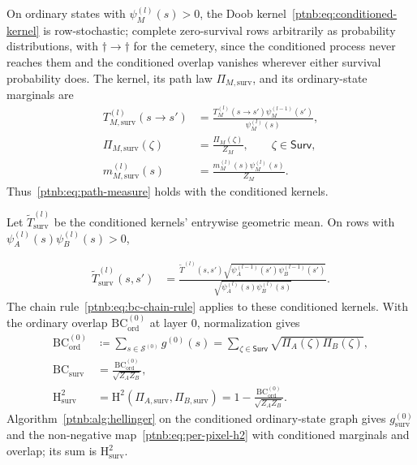\begin{theoremenv}
On ordinary states with $\psi_M^{(l)}(s)>0$, the Doob kernel~\eqref{ptnb:eq:conditioned-kernel} is row-stochastic; complete zero-survival rows arbitrarily as probability distributions, with $\dagger\to\dagger$ for the cemetery, since the conditioned process never reaches them and the conditioned overlap vanishes wherever either survival probability does. The kernel, its path law $\Pi_{M,\mathrm{surv}}$, and its ordinary-state marginals are
\begin{align}
 T_{M,\mathrm{surv}}^{(l)}(s\to s')
 &=\frac{T_M^{(l)}(s\to s')\psi_M^{(l-1)}(s')}{\psi_M^{(l)}(s)},
 \label{ptnb:eq:conditioned-kernel}\\
 \Pi_{M,\mathrm{surv}}(\zeta)
 &=\frac{\Pi_M(\zeta)}{Z_M},\qquad \zeta\in\mathsf{Surv},
 \label{ptnb:eq:conditioned-path-measure}\\
 m_{M,\mathrm{surv}}^{(l)}(s)
 &=\frac{m_M^{(l)}(s)\psi_M^{(l)}(s)}{Z_M}.
 \label{ptnb:eq:conditioned-alpha}
\end{align}
Thus~\eqref{ptnb:eq:path-measure} holds with the conditioned kernels.
{\setlength{\emergencystretch}{4em}%
Let $\widetilde T_{\mathrm{surv}}^{(l)}$ be the conditioned kernels' entrywise geometric mean. On rows with $\psi_A^{(l)}(s)\psi_B^{(l)}(s)>0$,\par}
\begin{align}
 \widetilde T_{\mathrm{surv}}^{(l)}(s,s')
 &=\frac{\widetilde T^{(l)}(s,s')\sqrt{\psi_A^{(l-1)}(s')\psi_B^{(l-1)}(s')}}
 {\sqrt{\psi_A^{(l)}(s)\psi_B^{(l)}(s)}}.
 \label{ptnb:eq:conditioned-geom-kernel}
\end{align}
The chain rule~\eqref{ptnb:eq:bc-chain-rule} applies to these conditioned kernels. With the ordinary overlap $\mathrm{BC}_{\mathrm{ord}}^{(0)}$ at layer $0$, normalization gives
\begin{align}
 \mathrm{BC}_{\mathrm{ord}}^{(0)}
 &\coloneqq\sum_{s\in\mathcal S^{(0)}}g^{(0)}(s)
 =\sum_{\zeta\in\mathsf{Surv}}\sqrt{\Pi_A(\zeta)\Pi_B(\zeta)},
 \label{ptnb:eq:ordinary-bc}\\
 \mathrm{BC}_{\mathrm{surv}}&=\frac{\mathrm{BC}_{\mathrm{ord}}^{(0)}}{\sqrt{Z_AZ_B}},
 \label{ptnb:eq:conditioned-bc-posthoc}\\
 \mathrm H_{\mathrm{surv}}^2
 &=\mathrm H^2(\Pi_{A,\mathrm{surv}},\Pi_{B,\mathrm{surv}})
 =1-\frac{\mathrm{BC}_{\mathrm{ord}}^{(0)}}{\sqrt{Z_AZ_B}}.
 \label{ptnb:eq:conditioned-h2}
\end{align}
Algorithm~\ref{ptnb:alg:hellinger} on the conditioned ordinary-state graph gives $g_{\mathrm{surv}}^{(0)}$ and the non-negative map~\eqref{ptnb:eq:per-pixel-h2} with conditioned marginals and overlap; its sum is $\mathrm H_{\mathrm{surv}}^2$.
\end{theoremenv}

